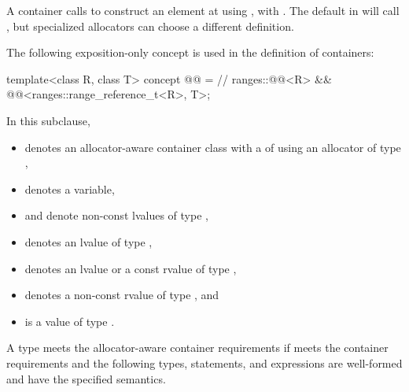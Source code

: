 \begin{note}
A container calls 
to construct an element at  using ,
with .
The default  in  will
call ,
but specialized allocators can choose a different definition.
\end{note}

\pnum
The following exposition-only concept is used in the definition of containers:
\begin{codeblock}
template<class R, class T>
concept @@ =    // \expos
  ranges::@@<R> && @@<ranges::range_reference_t<R>, T>;
\end{codeblock}

\pnum
In this subclause,
\begin{itemize}
\item
{} denotes an allocator-aware container class
with a  of  using an allocator of type ,
\item
{} denotes a variable,
\item
{} and  denote non-const lvalues of type ,
\item
{} denotes an lvalue of type ,
\item
{} denotes an lvalue or a const rvalue of type ,
\item
{} denotes a non-const rvalue of type , and
\item
{} is a value of type .
\end{itemize}

\renewcommand{\indexcont}[1]{%
\indexlibrarymisc{\idxcode{#1}}{allocator-aware containers}%
\indexlibrarymemberx{deque}{#1}%
\indexlibrarymemberx{forward_list}{#1}%
\indexlibrarymemberx{list}{#1}%
\indexlibrarymemberx{vector}{#1}%
\indexlibrarymemberx{map}{#1}%
\indexlibrarymemberx{set}{#1}%
\indexlibrarymemberx{multiset}{#1}%
\indexlibrarymemberx{multimap}{#1}%
\indexlibrarymemberx{unordered_map}{#1}%
\indexlibrarymemberx{unordered_set}{#1}%
\indexlibrarymemberx{unordered_multiset}{#1}%
\indexlibrarymemberx{unordered_multimap}{#1}%
}

A type  meets the allocator-aware container requirements
if  meets the container requirements and
the following types, statements, and expressions are well-formed and have
the specified semantics.

